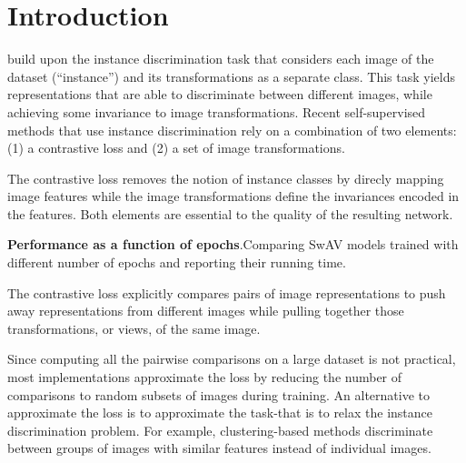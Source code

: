 \documentclass{tufte-handout}
\begin{document}
\section{Introduction}\label{sec:introductions}
 build upon the instance discrimination task that considers each image of the dataset (``instance'')
and its transformations as a separate class.
This task yields representations that are able to discriminate between different images, while achieving some invariance to image transformations.
Recent self-supervised methods that use instance discrimination rely on a combination of two elements: (1) a contrastive loss and (2) a set of image transformations.

The contrastive loss removes the notion of instance classes by direcly mapping image features while the image transformations define the invariances encoded in the features.
Both elements are essential to the quality of the resulting network. 

\begin{marginfigure}
  \begin{center}
  \end{center}
    \caption{\textbf{Performance as a function of epochs}.Comparing SwAV models trained with different number of epochs and reporting their running time.}
  \label{fig:marginfig}
  \end{marginfigure}

The contrastive loss explicitly compares pairs of image representations to push away representations from different images while pulling together those transformations, or views, of the same image.

Since computing all the pairwise comparisons on a large dataset is not practical, most implementations approximate the loss by reducing the number of comparisons to random subsets of images during training.
An alternative to approximate the loss is to approximate the task-that is to relax the instance discrimination problem.
For example, clustering-based methods discriminate between groups of images with similar features instead of individual images.
\end{document}
